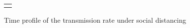 \documentclass[12pt]{article}
\begin{document}
\begin{figure}[tbh]%
\caption{Time profile of the transmission rate under social distancing}%
\label{fig: TR_dist}

\begin{center}%
\begin{tabular}
[c]{c}%
{\includegraphics[
height=1.9951in,
width=2.6524in
]%
{figs/theory_dist_TR.png}%
}
\end{tabular}



\end{center}

%

\end{figure}%
\end{document}
